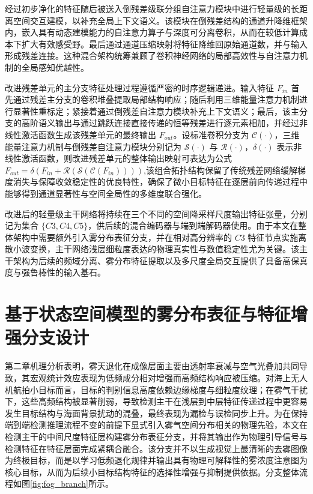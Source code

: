 经过初步净化的特征随后被送入倒残差级联分组自注意力模块中进行轻量级的长距离空间交互建模，以补充全局上下文语义。该模块在倒残差结构的通道升降维框架内，嵌入具有动态建模能力的自注意力算子与深度可分离卷积，从而在较低计算成本下扩大有效感受野。最后通过通道压缩映射将特征降维回原始通道数，并与输入形成残差连接。这种混合架构统筹兼顾了卷积神经网络的局部高效性与自注意力机制的全局感知优越性。

改进残差单元的主分支特征处理过程遵循严密的时序逻辑递进。输入特征 $F_{in}$ 首先通过残差主分支的卷积堆叠提取局部结构响应；随后利用三维能量注意力机制进行显著性重标定；紧接着通过倒残差自注意力模块补充上下文语义；最后，该主分支的高阶语义输出与通过跳跃连接直接传递的恒等残差进行逐元素相加，并经过非线性激活函数生成该残差单元的最终输出 $F_{out}$。设标准卷积分支为 $\mathcal{C}(\cdot)$，三维能量注意力机制与倒残差自注意力模块分别记为 $\mathcal{S}(\cdot)$ 与 $\mathcal{R}(\cdot)$，$\delta(\cdot)$ 表示非线性激活函数，则改进残差单元的整体输出映射可表达为公式$F_{out} = \delta\left(F_{in} + \mathcal{R}\left(\mathcal{S}\left(\mathcal{C}(F_{in})\right)\right)\right)$,该组合拓扑结构保留了传统残差网络缓解梯度消失与保障收敛稳定性的优良特性，确保了微小目标特征在逐层前向传递过程中能够得到通道显著性与空间全局性的多维度联合强化。

改进后的轻量级主干网络将持续在三个不同的空间降采样尺度输出特征张量，分别记为集合 $\{C3, C4, C5\}$，供后续的混合编码器与端到端解码器使用。由于本文在整体架构中需要额外引入雾分布表征分支，并在相对高分辨率的 $C3$ 特征节点实施离散小波变换，主干网络浅层细粒度表达的物理真实性与数值稳定性尤为关键。该主干架构为后续的频域分离、雾分布特征提取以及多尺度全局交互提供了具备高保真度与强鲁棒性的输入基石。


\section{基于状态空间模型的雾分布表征与特征增强分支设计}
\label{sec:fog_branch}

第二章机理分析表明，雾天退化在成像层面主要由透射率衰减与空气光叠加共同导致，其宏观统计效应表现为低频成分相对增强而高频结构响应被压缩。对海上无人机航拍小目标而言，目标的判别信息高度依赖边缘梯度与细粒度纹理；在雾气干扰下，这些高频结构被显著削弱，导致检测主干在浅层到中层特征传递过程中更容易发生目标结构与海面背景扰动的混叠，最终表现为漏检与误检同步上升。为在保持端到端检测推理流程不变的前提下显式引入雾气空间分布相关的物理先验，本文在检测主干的中间尺度特征层构建雾分布表征分支，并将其输出作为物理引导信号与检测特征在特征层面完成紧耦合融合。该分支并不以生成视觉上最清晰的去雾图像为终极目标，而是以学习低频退化规律并输出具有物理可解释性的雾浓度注意图为核心目标，从而为后续小目标结构特征的选择性增强与抑制提供依据。分支整体流程如图\ref{fig:fog_branch}所示。

